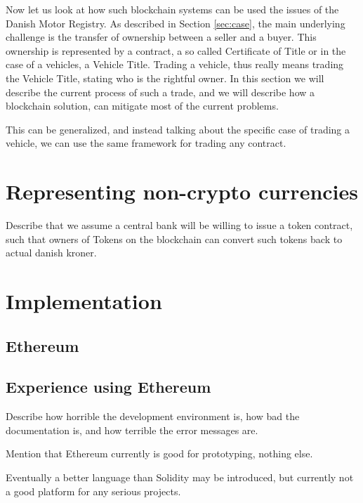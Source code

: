 \documentclass[oneside,a4paper,10pts,article]{memoir}
\begin{document}
Now let us look at how such blockchain systems can be used the issues
of the Danish Motor Registry. As described in Section \ref{sec:case},
the main underlying challenge is the transfer of ownership between a
seller and a buyer. This ownership is represented by a contract, a so
called Certificate of Title or in the case of a vehicles, a Vehicle
Title. Trading a vehicle, thus really means trading the Vehicle Title,
stating who is the rightful owner. In this section we will describe
the current process of such a trade, and we will describe how a
blockchain solution, can mitigate most of the current problems.




This can be generalized, and instead talking about the specific case
of trading a vehicle, we can use the same framework for trading any
contract.


\chapter{Representing non-crypto currencies}
\label{sec:currency}
Describe that we assume a central bank will be willing to issue a
token contract, such that owners of Tokens on the blockchain can
convert such tokens back to actual danish kroner.

\chapter{Implementation}
\label{sec:implementation}

\section{Ethereum}
\cite{buterin2013ethereum, wood2014ethereum}

\section{Experience using Ethereum}
Describe how horrible the development environment is, how bad the
documentation is, and how terrible the error messages are.

Mention that Ethereum currently is good for prototyping, nothing else. 

Eventually a better language than Solidity may be introduced, but
currently not a good platform for any serious projects.
\end{document}
